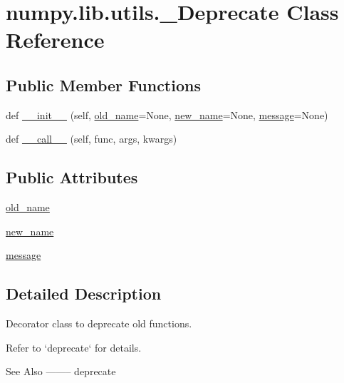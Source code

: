 \hypertarget{classnumpy_1_1lib_1_1utils_1_1__Deprecate}{}\section{numpy.\+lib.\+utils.\+\_\+\+Deprecate Class Reference}
\label{classnumpy_1_1lib_1_1utils_1_1__Deprecate}
\subsection*{Public Member Functions}
\begin{DoxyCompactItemize}
\item 
def \hyperlink{classnumpy_1_1lib_1_1utils_1_1__Deprecate_a2d9c6bf391fc4c43a598a0f9b2935541}{\+\_\+\+\_\+init\+\_\+\+\_\+} (self, \hyperlink{classnumpy_1_1lib_1_1utils_1_1__Deprecate_af5a322b21ef8c97a3bc30009460255ec}{old\+\_\+name}=None, \hyperlink{classnumpy_1_1lib_1_1utils_1_1__Deprecate_a64d101e5187b32b85c7286fa89bd0c62}{new\+\_\+name}=None, \hyperlink{classnumpy_1_1lib_1_1utils_1_1__Deprecate_ad2b81f45281d6a61a5e365c5b72eca9a}{message}=None)
\item 
def \hyperlink{classnumpy_1_1lib_1_1utils_1_1__Deprecate_ae41467a87d6cff8d90609b254b1a6e4f}{\+\_\+\+\_\+call\+\_\+\+\_\+} (self, func, args, kwargs)
\end{DoxyCompactItemize}
\subsection*{Public Attributes}
\begin{DoxyCompactItemize}
\item 
\hyperlink{classnumpy_1_1lib_1_1utils_1_1__Deprecate_af5a322b21ef8c97a3bc30009460255ec}{old\+\_\+name}
\item 
\hyperlink{classnumpy_1_1lib_1_1utils_1_1__Deprecate_a64d101e5187b32b85c7286fa89bd0c62}{new\+\_\+name}
\item 
\hyperlink{classnumpy_1_1lib_1_1utils_1_1__Deprecate_ad2b81f45281d6a61a5e365c5b72eca9a}{message}
\end{DoxyCompactItemize}


\subsection{Detailed Description}
\begin{DoxyVerb}Decorator class to deprecate old functions.

Refer to `deprecate` for details.

See Also
--------
deprecate\end{DoxyVerb}
 

